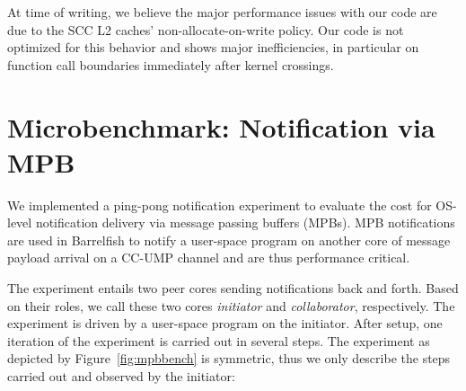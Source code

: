 \documentclass[a4paper,twoside]{report} %
\begin{document}
At time of writing, we believe the major performance issues with our
code are due to the SCC L2 caches' non-allocate-on-write policy. Our
code is not optimized for this behavior and shows major
inefficiencies, in particular on function call boundaries immediately after
kernel crossings.






\section{Microbenchmark: Notification via MPB}\label{sec:mpb_bench}

We implemented a ping-pong notification experiment to evaluate the
cost for OS-level notification delivery via message passing buffers
(MPBs). MPB notifications are used in Barrelfish to notify a
user-space program on another core of message payload arrival on a
CC-UMP channel and are thus performance critical.

The experiment entails two peer cores sending notifications back and
forth. Based on their roles, we call these two cores \emph{initiator}
and \emph{collaborator}, respectively. The experiment is driven by a
user-space program on the initiator. After setup, one iteration of the
experiment is carried out in several steps. The experiment as depicted
by Figure~\ref{fig:mpbbench} is symmetric, thus we only describe the
steps carried out and observed by the initiator:
\end{document}
